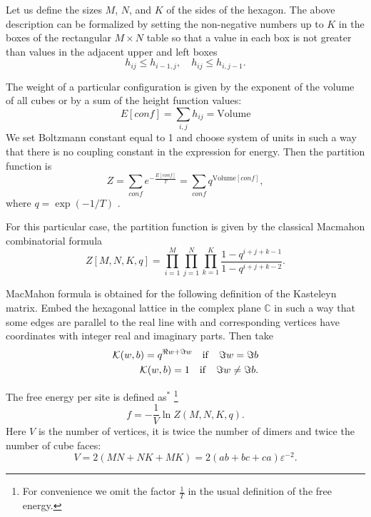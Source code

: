 \documentclass{article}
\begin{document}
Let us define the sizes $M$, $N$, and $K$ of the sides of the hexagon.
The above description can be formalized by
setting the non-negative numbers up to $K$ in the boxes of the rectangular $M\times N$ table so that a value in
each box is not greater than values in the adjacent upper and left boxes
\begin{equation}
  \label{eq:1}
  h_{ij}\leq h_{i-1,j},\quad h_{ij}\leq h_{i,j-1}.
\end{equation}

The weight of a particular configuration is given by the exponent of the volume of all cubes or by a
sum of the height function values:
\begin{equation*}
  \label{eq:10}
  E[conf]=\sum_{i,j} h_{ij}=\mathrm{Volume}
\end{equation*}
We set Boltzmann constant equal to 1 and choose system of units in such a way that there is no
coupling constant in the expression for energy. Then the partition function is
\begin{equation*}
  \label{eq:14}
  Z=\sum_{conf} e^{-\frac{E[conf]}{T}}=\sum_{conf}q^{\mathrm{Volume}[conf]}, 
\end{equation*}
where $q=\exp\left(-1/T\right)$ .

For this particular case, the partition function is given by the classical Macmahon combinatorial
formula~\cite{vuletic2009generalization}
\begin{equation}
  \label{eq:12}
   Z[M,N,K,q]=\prod_{i=1}^{M}\prod_{j=1}^{N}\prod_{k=1}^{K}\frac{1-q^{i+j+k-1}}{1-q^{i+j+k-2}}.
\end{equation}


MacMahon formula is obtained for the following definition of the Kasteleyn matrix. Embed the
hexagonal lattice in the complex plane $\mathbb{C}$ in such a way that some edges are parallel to
the real line with and corresponding vertices have coordinates with integer real and imaginary
parts. Then take
\begin{eqnarray}
  \label{eq:18}
  {\cal K}(w,b)=q^{\Re w+\Im w} \quad \mathrm{if}\quad \Im w=\Im b\\
  {\cal K}(w,b)=1 \quad \mathrm{if}\quad \Im w\neq\Im b.
\end{eqnarray}


The   free energy per site is defined as$^{*}$
\footnote{For convenience we omit the factor $\frac{1}{T}$ in the usual definition of the free energy.}
\begin{equation*}
  \label{eq:17}
  f=-\frac{1}{V}\ln Z(M,N,K,q).
\end{equation*}
Here $V$ is the number of vertices, it is twice the number of dimers and twice the number of  cube faces:
\begin{equation}
  \label{eq:19}
  V=2(MN+NK+MK)=2(ab+bc+ca) \varepsilon^{-2}.
\end{equation}
\end{document}
